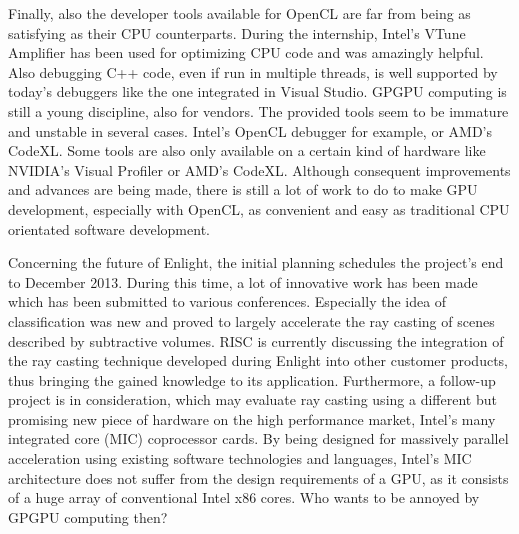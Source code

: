 Finally, also the developer tools available for OpenCL are far from being as satisfying as their CPU counterparts. During the internship, Intel's VTune Amplifier has been used for optimizing CPU code and was amazingly helpful. Also debugging C++ code, even if run in multiple threads, is well supported by today's debuggers like the one integrated in Visual Studio. GPGPU computing is still a young discipline, also for vendors. The provided tools seem to be immature and unstable in several cases. Intel's OpenCL debugger for example, or AMD's CodeXL. Some tools are also only available on a certain kind of hardware like NVIDIA's Visual Profiler or AMD's CodeXL. Although consequent improvements and advances are being made, there is still a lot of work to do to make GPU development, especially with OpenCL, as convenient and easy as traditional CPU orientated software development.

Concerning the future of Enlight, the initial planning schedules the project's end to December 2013. During this time, a lot of innovative work has been made which has been submitted to various conferences. Especially the idea of classification was new and proved to largely accelerate the ray casting of scenes described by subtractive volumes. RISC is currently discussing the integration of the ray casting technique developed during Enlight into other customer products, thus bringing the gained knowledge to its application. Furthermore, a follow-up project is in consideration, which may evaluate ray casting using a different but promising new piece of hardware on the high performance market, Intel's many integrated core (MIC) coprocessor cards. By being designed for massively parallel acceleration using existing software technologies and languages, Intel's MIC architecture does not suffer from the design requirements of a GPU, as it consists of a huge array of conventional Intel x86 cores. Who wants to be annoyed by GPGPU computing then?
